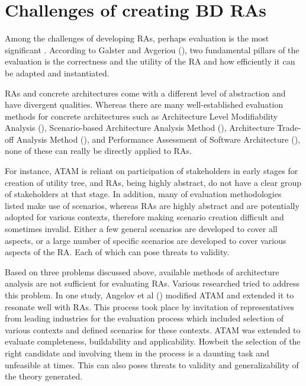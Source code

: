 \documentclass[review]{elsarticle}
\begin{document}
\section{Challenges of creating BD RAs}

Among the challenges of developing RAs, perhaps evaluation is the most significant \cite{Maier}. According to Galster and Avgeriou (\cite{galster2011empirically}), two fundamental pillars of the evaluation is the correctness and the utility of the RA and how efficiently it can be adapted and instantiated. 

RAs and concrete architectures come with a different level of abstraction and have divergent qualities. Whereas there are many well-established evaluation methods for concrete architectures such as Architecture Level Modifiability Analysis (\cite{Bengtsson}), Scenario-based Architecture Analysis Method (\cite{kazman1994saam}), Architecture Trade-off Analysis Method (\cite{KazmanATAM}), and Performance Assessment of Software Architecture (\cite{Williams}), none of these can really be directly applied to RAs. 

For instance, ATAM is reliant on participation of stakeholders in early stages for creation of utility tree, and RAs, being highly abstract, do not have a clear group of stakeholders at that stage. In addition, many of evaluation methodologies listed make use of scenarios, whereas RAs are highly abstract and are potentially adopted for various contexts, therefore making scenario creation difficult and sometimes invalid. Either a few general scenarios are developed to cover all aspects, or a large number of specific scenarios are developed to cover various aspects of the RA. Each of which can pose threats to validity.

Based on three problems discussed above, available methods of architecture analysis are not sufficient for evaluating RAs. Various researched tried to address this problem. In one study, Angelov et al (\cite{angelov2008towards}) modified ATAM and extended it to resonate well with RAs. This process took place by invitation of representatives from leading industries for the evaluation process which included selection of various contexts and defined scenarios for these contexts. ATAM was extended to evaluate completeness, buildability and applicability. Howbeit the selection of the right candidate and involving them in the process is a daunting task and unfeasible at times. This can also poses threats to validity and generalizability of the theory generated. 
\end{document}
